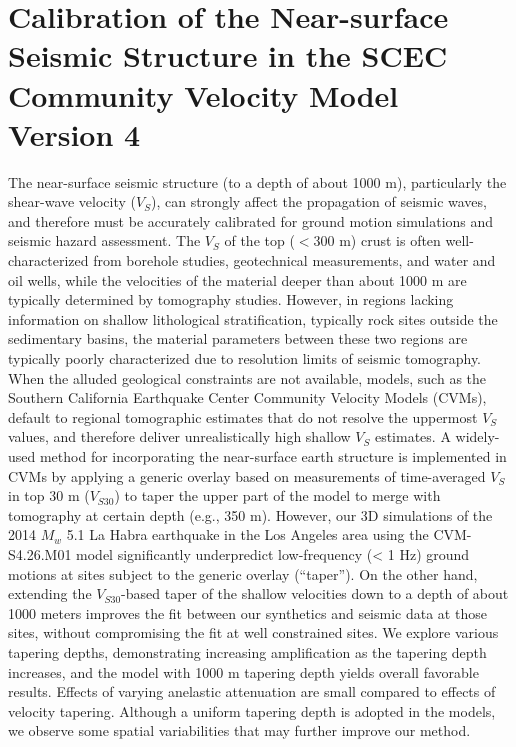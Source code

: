 
\linespread{1.7}
\chapter{Calibration of the Near-surface Seismic Structure in the SCEC Community Velocity Model Version 4}
\linespread{2.0}
\label{chap:vs30}

\graphicspath{{/Users/zhh076/work/PhD_way/vs30/}}

The near-surface seismic structure (to a depth of about 1000 m), particularly the shear-wave velocity ($V_S$), can strongly affect the propagation of seismic waves, and therefore must be accurately calibrated for ground motion simulations and seismic hazard assessment. The $V_S$ of the top ($< 300$ m) crust is often well-characterized from borehole studies, geotechnical measurements, and water and oil wells, while the velocities of the material deeper than about 1000 m are typically determined by tomography studies. However, in regions lacking information on shallow lithological stratification, typically rock sites outside the sedimentary basins, the material parameters between these two regions are typically poorly characterized due to resolution limits of seismic tomography. When the alluded geological constraints are not available, models, such as the Southern California Earthquake Center Community Velocity Models (CVMs), default to regional tomographic estimates that do not resolve the uppermost $V_S$ values, and therefore deliver unrealistically high shallow $V_S$ estimates. A widely-used method for incorporating the near-surface earth structure is implemented in CVMs by applying a generic overlay based on measurements of time-averaged $V_S$ in top 30 m ($V_{S30}$) to taper the upper part of the model to merge with tomography at certain depth (e.g., 350 m). However, our 3D simulations of the 2014 $M_w$ 5.1 La Habra earthquake in the Los Angeles area using the CVM-S4.26.M01 model significantly underpredict low-frequency (< 1 Hz) ground motions at sites subject to the generic overlay (``taper''). On the other hand, extending the $V_{S30}$-based taper of the shallow velocities down to a depth of about 1000 meters improves the fit between our synthetics and seismic data at those sites, without compromising the fit at well constrained sites. We explore various tapering depths, demonstrating increasing amplification as the tapering depth increases, and the model with 1000 m tapering depth yields overall favorable results. Effects of varying anelastic attenuation are small compared to effects of velocity tapering. Although a uniform tapering depth is adopted in the models, we observe some spatial variabilities that may further improve our method.


